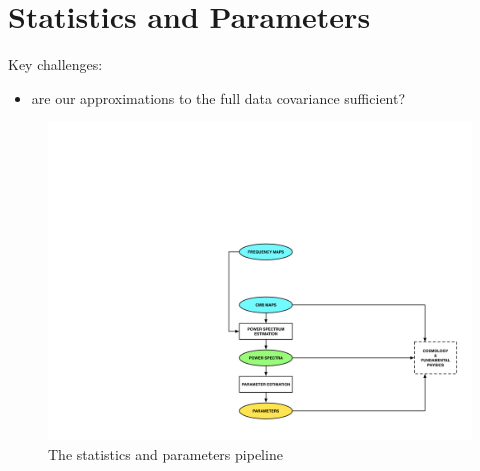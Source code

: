 
\section{Statistics and Parameters}

Key challenges:
\begin{itemize}
\item are our approximations to the full data covariance sufficient?
\end{itemize}

\begin{figure}[htbp]
\centering
\includegraphics[width=1\textwidth]{Analysis/sp}
\caption{The statistics and parameters pipeline}
\label{default}

\end{figure}


%



